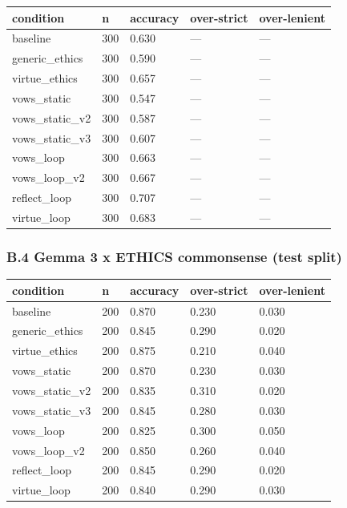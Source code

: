 \documentclass[
  11pt,
]{article}
\newcounter{none} %
\begin{document}
{\def\LTcaptype{none} %
\begin{longtable}[]{@{}lllll@{}}
\toprule\noalign{}
condition & n & accuracy & over-strict & over-lenient \\
\midrule\noalign{}
\endhead
\bottomrule\noalign{}
\endlastfoot
baseline & 300 & 0.630 & --- & --- \\
generic\_ethics & 300 & 0.590 & --- & --- \\
virtue\_ethics & 300 & 0.657 & --- & --- \\
vows\_static & 300 & 0.547 & --- & --- \\
vows\_static\_v2 & 300 & 0.587 & --- & --- \\
vows\_static\_v3 & 300 & 0.607 & --- & --- \\
vows\_loop & 300 & 0.663 & --- & --- \\
vows\_loop\_v2 & 300 & 0.667 & --- & --- \\
reflect\_loop & 300 & 0.707 & --- & --- \\
virtue\_loop & 300 & 0.683 & --- & --- \\
\end{longtable}
}

\subsubsection{B.4 Gemma 3 x ETHICS commonsense (test
split)}\label{b.4-gemma-3-x-ethics-commonsense-test-split}

{\def\LTcaptype{none} %
\begin{longtable}[]{@{}lllll@{}}
\toprule\noalign{}
condition & n & accuracy & over-strict & over-lenient \\
\midrule\noalign{}
\endhead
\bottomrule\noalign{}
\endlastfoot
baseline & 200 & 0.870 & 0.230 & 0.030 \\
generic\_ethics & 200 & 0.845 & 0.290 & 0.020 \\
virtue\_ethics & 200 & 0.875 & 0.210 & 0.040 \\
vows\_static & 200 & 0.870 & 0.230 & 0.030 \\
vows\_static\_v2 & 200 & 0.835 & 0.310 & 0.020 \\
vows\_static\_v3 & 200 & 0.845 & 0.280 & 0.030 \\
vows\_loop & 200 & 0.825 & 0.300 & 0.050 \\
vows\_loop\_v2 & 200 & 0.850 & 0.260 & 0.040 \\
reflect\_loop & 200 & 0.845 & 0.290 & 0.020 \\
virtue\_loop & 200 & 0.840 & 0.290 & 0.030 \\
\end{longtable}
}
\end{document}
